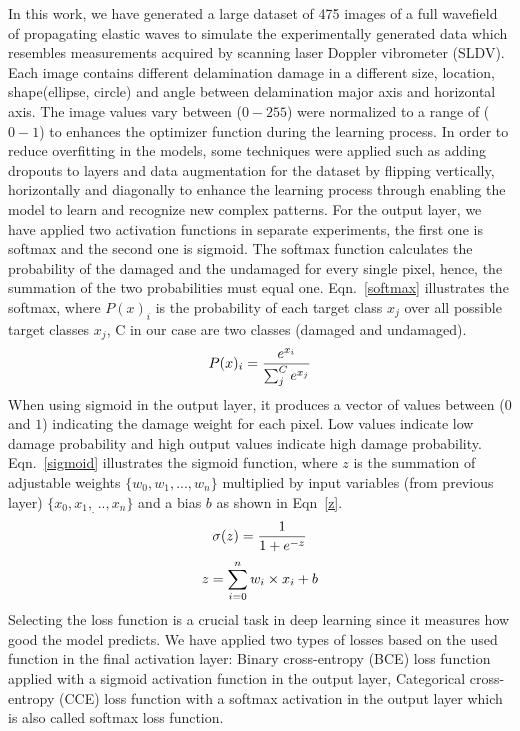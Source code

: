 \documentclass[preprint,10pt]{elsarticle}
\begin{document}
In this work, we have generated a large dataset of 475 images of a full wavefield of propagating elastic waves to simulate the experimentally generated data which resembles measurements acquired by scanning laser Doppler vibrometer (SLDV).
Each image contains different delamination damage in a different size, location, shape(ellipse, circle) and angle between delamination major axis and horizontal axis.
The image values vary between (\(0 - 255\)) were normalized to a range of (\(0-1\)) to enhances the optimizer function during the learning process. 
In order to reduce overfitting in the models, some techniques were applied such as adding dropouts to layers and data augmentation for the dataset by flipping vertically, horizontally and diagonally to enhance the learning process through enabling the model to learn and recognize new complex patterns.
For the output layer, we have applied two activation functions in separate experiments, the first one is softmax and the second one is sigmoid. 
The softmax function calculates the probability of the damaged and the undamaged for every single pixel, hence, the summation of the two probabilities must equal one. Eqn.~\ref{softmax} illustrates the softmax, where \(P(x)_{i}\) is the probability of each target class \(x_{j}\) over all possible target classes \(x_{j}\), C in our case are two classes  (damaged and undamaged).
\begin{equation}
\footnotesize
P(x)_{i} = \frac{e^{x_{i}}}{\sum_{j}^{C} e^{x_{j}}}
\label{softmax}
\end{equation} 
When using sigmoid in the output layer, it produces a vector of values between (\(0\) and \(1\)) indicating the damage weight for each pixel. 
Low values indicate low damage probability and high output values indicate high damage probability. Eqn.~\ref{sigmoid} illustrates the sigmoid function, 
where \(z\) is the summation of adjustable weights \(\{w_0,w_1,...,w_n \}\) multiplied by input variables (from previous layer) \(\{x_0,x_1,_...,x_n\}\) and a bias \(b\) as shown in Eqn~\ref{z}.
\begin{equation}
\footnotesize
	\sigma(z) = \frac{1}{1+e^{-z}}
	\label{sigmoid}
\end{equation}
\begin{equation}
\footnotesize
	z= \sum_{i=0}^{n}  w_i\times x_i +b
	\label{z}
\end{equation}
Selecting the loss function is a crucial task in deep learning since it measures how good the model predicts.
We have applied two types of losses based on the used function in the final activation layer: Binary cross-entropy (BCE) loss function applied with a sigmoid activation function in the output layer, Categorical cross-entropy (CCE) loss function with a softmax activation in the output layer which is also called softmax loss function.
\end{document}
